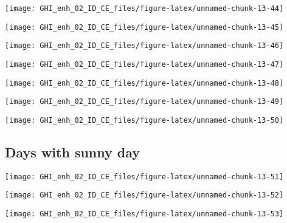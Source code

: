 \documentclass[
  10pt,
  a4paper,oneside]{article}
\begin{document}
\begin{center}\texttt{[image: GHI\_enh\_02\_ID\_CE\_files/figure-latex/unnamed-chunk-13-44]} \end{center}

\begin{center}\texttt{[image: GHI\_enh\_02\_ID\_CE\_files/figure-latex/unnamed-chunk-13-45]} \end{center}

\begin{center}\texttt{[image: GHI\_enh\_02\_ID\_CE\_files/figure-latex/unnamed-chunk-13-46]} \end{center}

\begin{center}\texttt{[image: GHI\_enh\_02\_ID\_CE\_files/figure-latex/unnamed-chunk-13-47]} \end{center}

\begin{center}\texttt{[image: GHI\_enh\_02\_ID\_CE\_files/figure-latex/unnamed-chunk-13-48]} \end{center}

\begin{center}\texttt{[image: GHI\_enh\_02\_ID\_CE\_files/figure-latex/unnamed-chunk-13-49]} \end{center}

\begin{center}\texttt{[image: GHI\_enh\_02\_ID\_CE\_files/figure-latex/unnamed-chunk-13-50]} \end{center}

\FloatBarrier

\hypertarget{days-with-sunny-day}{%
\subsection{Days with sunny day}\label{days-with-sunny-day}}

\begin{center}\texttt{[image: GHI\_enh\_02\_ID\_CE\_files/figure-latex/unnamed-chunk-13-51]} \end{center}

\begin{center}\texttt{[image: GHI\_enh\_02\_ID\_CE\_files/figure-latex/unnamed-chunk-13-52]} \end{center}

\begin{center}\texttt{[image: GHI\_enh\_02\_ID\_CE\_files/figure-latex/unnamed-chunk-13-53]} \end{center}
\end{document}
